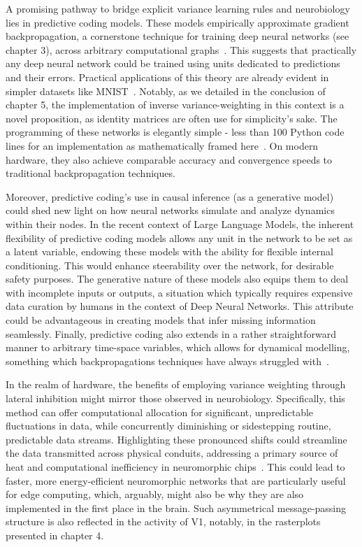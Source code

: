 A promising pathway to bridge explicit variance learning rules and neurobiology lies in predictive coding models. These models empirically approximate gradient backpropagation, a cornerstone technique for training deep neural networks (see chapter 3), across arbitrary computational graphs~\cite{millidge2022predictive}. This suggests that practically any deep neural network could be trained using units dedicated to predictions and their errors. Practical applications of this theory are already evident in simpler datasets like MNIST~\cite{millidge2020relaxing}. Notably, as we detailed in the conclusion of chapter 5, the implementation of inverse variance-weighting in this context is a novel proposition, as identity matrices are often use for simplicity's sake. The programming of these networks is elegantly simple - less than 100 Python code lines for an implementation as mathematically framed here~\cite{millidge2020relaxing}. On modern hardware, they also achieve comparable accuracy and convergence speeds to traditional backpropagation techniques.

Moreover, predictive coding's use in causal inference (as a generative model) could shed new light on how neural networks simulate and analyze dynamics within their nodes. In the recent context of Large Language Models, the inherent flexibility of predictive coding models allows any unit in the network to be set as a latent variable, endowing these models with the ability for flexible internal conditioning. This would enhance steerability over the network, for desirable safety purposes. The generative nature of these models also equips them to deal with incomplete inputs or outputs, a situation which typically requires expensive data curation by humans in the context of Deep Neural Networks. This attribute could be advantageous in creating models that infer missing information seamlessly. Finally, predictive coding also extends in a rather straightforward manner to arbitrary time-space variables, which allows for dynamical modelling, something which backpropagations techniques have always struggled with~\cite{millidge2022predictive}.

In the realm of hardware, the benefits of employing variance weighting through lateral inhibition might mirror those observed in neurobiology. Specifically, this method can offer computational allocation for significant, unpredictable fluctuations in data, while concurrently diminishing or sidestepping routine, predictable data streams. Highlighting these pronounced shifts could streamline the data transmitted across physical conduits, addressing a primary source of heat and computational inefficiency in neuromorphic chips~\cite{eshraghian2022memristor, rahimi2020complementary}. This could lead to faster, more energy-efficient neuromorphic networks that are particularly useful for edge computing, which, arguably, might also be why they are also implemented in the first place in the brain. Such asymmetrical message-passing structure is also reflected in the activity of \gls{V1}, notably, in the rasterplots presented in chapter 4.



